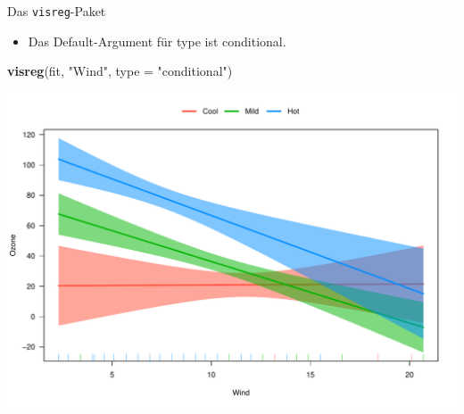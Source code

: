 \documentclass[ignorenonframetext,]{beamer}
\newenvironment{Shaded}{}{}
\newcommand{\KeywordTok}[1]{\textcolor[rgb]{0.00,0.44,0.13}{\textbf{{#1}}}}
\newcommand{\DataTypeTok}[1]{\textcolor[rgb]{0.56,0.13,0.00}{{#1}}}
\newcommand{\StringTok}[1]{\textcolor[rgb]{0.25,0.44,0.63}{{#1}}}
\newcommand{\NormalTok}[1]{{#1}}
\providecommand{\tightlist}{%
\setlength{\itemsep}{0pt}\setlength{\parskip}{0pt}}
\begin{document}
\begin{frame}[fragile]{Das \texttt{visreg}-Paket}

\begin{itemize}
\tightlist
\item
  Das Default-Argument für type ist conditional.
\end{itemize}

\begin{Shaded}
\begin{Highlighting}[]
\KeywordTok{visreg}\NormalTok{(fit, }\StringTok{"Wind"}\NormalTok{, }\DataTypeTok{type =} \StringTok{"conditional"}\NormalTok{)}
\end{Highlighting}
\end{Shaded}

\includegraphics{R_intern_files/figure-beamer/unnamed-chunk-312-1.pdf}

\end{frame}
\end{document}

